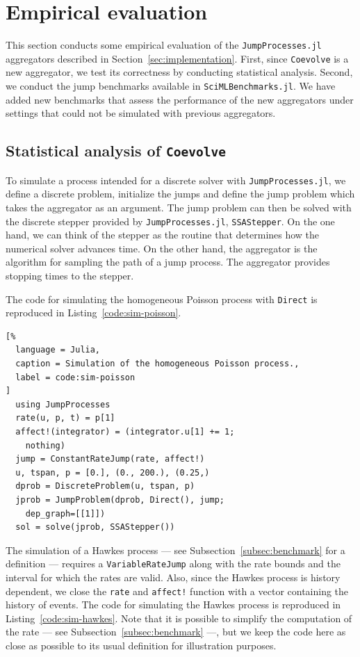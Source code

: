 \documentclass{juliacon}
\numberwithin{equation}{section}
\begin{document}
\section{Empirical evaluation}

This section conducts some empirical evaluation of the \texttt{JumpProcesses.jl} aggregators described in Section~\ref{sec:implementation}. First, since \texttt{Coevolve} is a new aggregator, we test its correctness by conducting statistical analysis. Second, we conduct the jump benchmarks available in  \texttt{SciMLBenchmarks.jl}. We have added new benchmarks that assess the performance of the new aggregators under settings that could not be simulated with previous aggregators.

\subsection{Statistical analysis of \texttt{Coevolve}}

To simulate a process intended for a discrete solver with \texttt{JumpProcesses.jl}, we define a discrete problem, initialize the jumps and define the jump problem which takes the aggregator as an argument. The jump problem can then be solved with the discrete stepper provided by \texttt{JumpProcesses.jl}, \texttt{SSAStepper}. On the one hand, we can think of the stepper as the routine that determines how the numerical solver advances time. On the other hand, the aggregator is the algorithm for sampling the path of a jump process. The aggregator provides stopping times to the stepper.

The code for simulating the homogeneous Poisson process with \texttt{Direct} is reproduced in Listing~\ref{code:sim-poisson}.

\begin{lstlisting}[%
  language = Julia,
  caption = Simulation of the homogeneous Poisson process.,
  label = code:sim-poisson
]
  using JumpProcesses
  rate(u, p, t) = p[1]
  affect!(integrator) = (integrator.u[1] += 1;
    nothing)
  jump = ConstantRateJump(rate, affect!)
  u, tspan, p = [0.], (0., 200.), (0.25,)
  dprob = DiscreteProblem(u, tspan, p)
  jprob = JumpProblem(dprob, Direct(), jump;
    dep_graph=[[1]])
  sol = solve(jprob, SSAStepper())
\end{lstlisting}

The simulation of a Hawkes process --- see Subsection~\ref{subsec:benchmark} for a definition --- requires a \texttt{VariableRateJump} along with the rate bounds and the interval for which the rates are valid. Also, since the Hawkes process is history dependent, we close the \texttt{rate} and \texttt{affect!} function with a vector containing the history of events. The code for simulating the Hawkes process is reproduced in Listing~\ref{code:sim-hawkes}. Note that it is possible to simplify the computation of the rate --- see Subsection~\ref{subsec:benchmark} ---, but we keep the code here as close as possible to its usual definition for illustration purposes.
\end{document}
